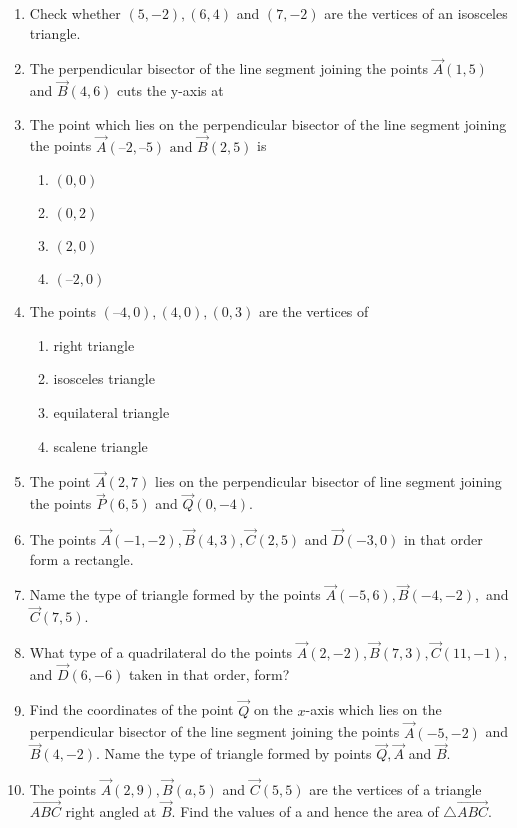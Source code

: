 \begin{enumerate}[label=\thesubsection.\arabic*, ref=\thesubsection.\theenumi]
	\\
		
\item Check whether $(5, -2),  (6, 4)$ and $(7, -2)$ are the vertices of an isosceles triangle.
\item The perpendicular bisector of the line segment joining the points $\vec{A} (1,  5) $ and $
\vec{B} (4,  6)$ cuts the y-axis at
\item The point which lies on the perpendicular bisector of the line segment joining the
	points $\vec{A} (–2,  –5)\text { and } \vec{B} (2,  5) $ is
\begin{enumerate}
\item  	$(0,  0)$
\item  $(0,  2)$ 
\item  $(2,  0)$ 
\item  $(–2,  0)$
\end{enumerate}
\item The points $ (–4,  0),  (4,  0),  (0,  3) $ are the vertices of
	\begin{enumerate}
\item right triangle 
\item isosceles triangle
\item  equilateral triangle
\item  scalene triangle 
\end{enumerate}
\item The point $\vec{A}(2, 7)$ lies on the perpendicular bisector of line segment joining the points $\vec{P}(6, 5)$ and $ \vec{Q}(0, -4)$.
\item The points $\vec{A}(-1, -2),  \vec{B}(4, 3),  \vec{C}(2, 5) $ and $ \vec{D}(-3, 0)$ in that order form a rectangle.
\item Name the type of triangle formed by the points $\vec{A}(-5, 6), \vec{B}(-4, -2), $ and $\vec{C}(7, 5)$.
\item What type of a quadrilateral do the points $\vec{A}(2, -2), \vec{B}(7, 3), \vec{C}(11, -1), $ and $\vec{D}(6, -6)$ taken in that order,  form?
\item Find the coordinates of the point $\vec{Q}$ on the $x$-axis which lies on the perpendicular bisector of the line segment joining the points $\vec{A}(-5, -2) $ and $ \vec{B}(4, -2)$. Name the type of triangle formed by points $\vec{Q}, \vec{A}$ and $\vec{B}$.
\item The points $\vec{A}(2, 9), \vec{B}(a, 5) $ and $\vec{C}(5, 5)$ are the vertices of a triangle $\vec{ABC}$ right angled at $\vec{B}$. Find the values of a and hence the area of $\triangle \vec{ABC}$.

\end{enumerate}
